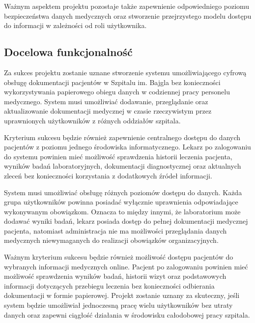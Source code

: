 Ważnym aspektem projektu pozostaje także zapewnienie odpowiedniego poziomu bezpieczeństwa danych medycznych oraz stworzenie przejrzystego modelu dostępu do informacji w zależności od roli użytkownika.

\subsection{Docelowa funkcjonalność}
Za sukces projektu zostanie uznane stworzenie systemu umożliwiającego cyfrową obsługę dokumentacji pacjentów w Szpitalu im. Bajgla bez konieczności wykorzystywania papierowego obiegu danych w codziennej pracy personelu medycznego. System musi umożliwiać dodawanie, przeglądanie oraz aktualizowanie dokumentacji medycznej w czasie rzeczywistym przez uprawnionych użytkowników z różnych oddziałów szpitala.

Kryterium sukcesu będzie również zapewnienie centralnego dostępu do danych pacjentów z poziomu jednego środowiska informatycznego. Lekarz po zalogowaniu do systemu powinien mieć możliwość sprawdzenia historii leczenia pacjenta, wyników badań laboratoryjnych, dokumentacji diagnostycznej oraz aktualnych zleceń bez konieczności korzystania z dodatkowych źródeł informacji.

System musi umożliwiać obsługę różnych poziomów dostępu do danych. Każda grupa użytkowników powinna posiadać wyłącznie uprawnienia odpowiadające wykonywanym obowiązkom. Oznacza to między innymi, że laboratorium może dodawać wyniki badań, lekarz posiada dostęp do pełnej dokumentacji medycznej pacjenta, natomiast administracja nie ma możliwości przeglądania danych medycznych niewymaganych do realizacji obowiązków organizacyjnych.

Ważnym kryterium sukcesu będzie również możliwość dostępu pacjentów do wybranych informacji medycznych online. Pacjent po zalogowaniu powinien mieć możliwość sprawdzenia wyników badań, historii wizyt oraz podstawowych informacji dotyczących przebiegu leczenia bez konieczności odbierania dokumentacji w formie papierowej.
Projekt zostanie uznany za skuteczny, jeśli system będzie umożliwiał jednoczesną pracę wielu użytkowników bez utraty danych oraz zapewni ciągłość działania w środowisku całodobowej pracy szpitala. 